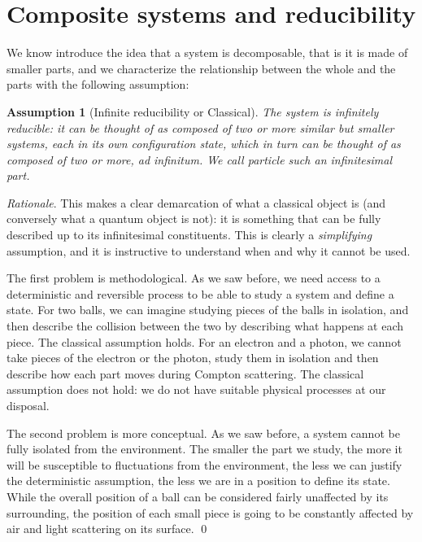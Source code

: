 \documentclass[aps,pra,10pt,twocolumn,floatfix,nofootinbib]{revtex4-1}
\newtheorem{assump}{Assumption}
\theoremstyle{definition}
\newenvironment{rationale}{\emph{Rationale}.}{\qed}
\begin{document}
\section{Composite systems and reducibility}

We know introduce the idea that a system is decomposable, that is it is made of smaller parts, and we characterize the relationship between the whole and the parts with the following assumption:

\begin{assump}[Infinite reducibility or Classical]\label{classical}
The system is infinitely reducible: it can be thought of as composed of two or more similar but smaller systems, each in its own configuration state, which in turn can be thought of as composed of two or more, ad infinitum. We call \emph{particle} such an infinitesimal part.
\end{assump}

\begin{rationale}
This makes a clear demarcation of what a classical object is (and conversely what a quantum object is not): it is something that can be fully described up to its infinitesimal constituents. This is clearly a \emph{simplifying} assumption, and it is instructive to understand when and why it cannot be used.

The first problem is methodological. As we saw before, we need access to a deterministic and reversible process to be able to study a system and define a state. For two balls, we can imagine studying pieces of the balls in isolation, and then describe the collision between the two by describing what happens at each piece. The classical assumption holds. For an electron and a photon, we cannot take pieces of the electron or the photon, study them in isolation and then describe how each part moves during Compton scattering. The classical assumption does not hold: we do not have suitable physical processes at our disposal.

The second problem is more conceptual. As we saw before, a system cannot be fully isolated from the environment. The smaller the part we study, the more it will be susceptible to fluctuations from the environment, the less we can justify the deterministic assumption, the less we are in a position to define its state. While the overall position of a ball can be considered fairly unaffected by its surrounding, the position of each small piece is going to be constantly affected by air and light scattering on its surface.
\end{rationale}
\end{document}
